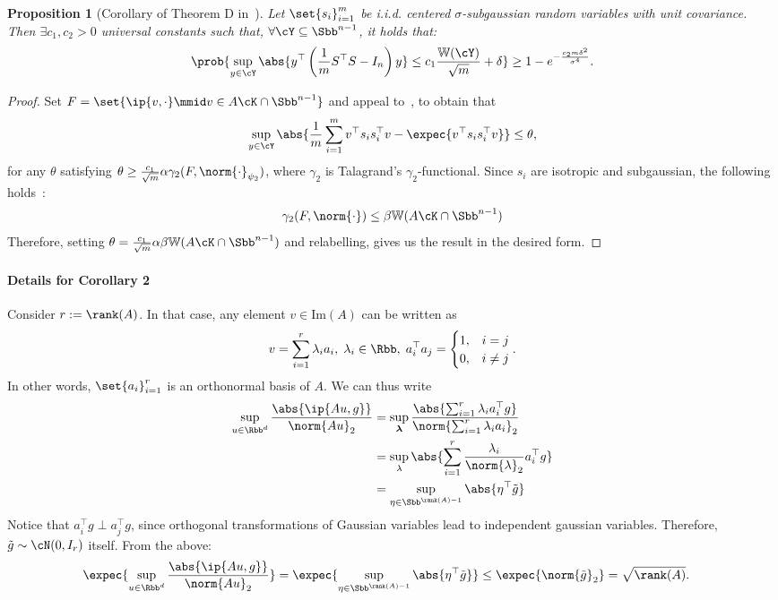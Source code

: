 \documentclass[a4paper]{article}
\newtheorem{proposition}{Proposition}
\begin{document}
\begin{proposition}[Corollary of Theorem D in~\cite{MenPajTom07}]
    Let $\set{s_i}_{i=1}^m$ be i.i.d. centered $\sigma$-subgaussian random
    variables with unit covariance. Then $\exists c_1, c_2 > 0$ universal
    constants such that, $\forall \cY \subseteq \Sbb^{n - 1}$, it holds that:
    \[
        \prob{\sup_{y \in \cY} \abs{y^\top \left(
            \frac{1}{m} S^\top S - I_n
        \right) y} \leq c_1 \frac{\mathbb{W}(\cY)}{\sqrt{m}} + \delta
        } \geq 1 - e^{-\frac{c_2 m \delta^2}{\sigma^4}}.
    \]
\end{proposition}
\begin{proof}
    Set $F = \set{\ip{v, \cdot} \mmid v \in A \cK \cap \Sbb^{n-1}}$ and appeal
    to~\cite[Theorem D]{MenPajTom07}, to obtain that
    \[
        \sup_{y \in \cY} \abs{\frac{1}{m} \sum_{i=1}^m
        v^\top s_i s_i^\top v - \expec{v^\top s_i s_i^\top v}}
        \leq \theta,
    \]
    for any $\theta$ satisfying $\theta \geq \frac{c_1}{\sqrt{m}} \alpha
    \gamma_2(F, \norm{\cdot}_{\psi_2})$, where $\gamma_2$ is Talagrand's
    $\gamma_2$-functional. Since $s_i$ are isotropic and subgaussian, the
    following holds~\cite[Section 2]{MenPajTom07}:
    \[
        \gamma_2(F, \norm{\cdot}) \leq
        \beta \mathbb{W}(A \cK \cap \Sbb^{n - 1})
    \]
    Therefore, setting $\theta = \frac{c_1}{\sqrt{m}} \alpha \beta
    \mathbb{W}(A \cK \cap \Sbb^{n-1})$ and relabelling, gives us the result
    in the desired form.
\end{proof}

\paragraph{Details for Corollary 2}
Consider $r := \rank(A)$. In that case, any element $v \in \mathrm{Im}(A)$ can
be written as
\[
    v = \sum_{i=1}^{r} \lambda_i a_i, \; \lambda_i \in \Rbb,
    \; a_i^\top a_j = \begin{cases}
        1, & i = j \\
        0, & i \neq j
    \end{cases}.
\]
In other words, $\set{a_i}_{i=1}^r$ is an orthonormal basis of $A$. We can thus
write
\begin{align*}
    \sup_{u \in \Rbb^d} \frac{\abs{\ip{Au, g}}}{\norm{Au}_2} &=
    \sup_{\bm{\lambda}} \frac{\abs{\sum_{i=1}^r \lambda_i a_i^\top g}}{
        \norm{\sum_{i=1}^r \lambda_i a_i}_2} \\
    &= \sup_{\lambda}
        \abs{\sum_{i=1}^r \frac{\lambda_i}{\norm{\lambda}_2} a_i^\top g} \\
    &= \sup_{\eta \in \Sbb^{\rank(A) - 1}} \abs{\eta^\top \tilde{g}}
\end{align*}
Notice that $a_i^\top g \perp a_j^\top g$, since orthogonal transformations of
Gaussian variables lead to independent gaussian variables. Therefore,
$\tilde{g} \sim \cN(0, I_r)$ itself. From the above:
\begin{align*}
    \expec{\sup_{u \in \Rbb^d} \frac{\abs{\ip{Au, g}}}{\norm{Au}_2}} &=
    \expec{\sup_{\eta \in \Sbb^{\rank(A) - 1}} \abs{\eta^\top \tilde{g}}} \leq
    \expec{\norm{\tilde{g}}_2} =
    \sqrt{\rank(A)}.
\end{align*}
\end{document}
